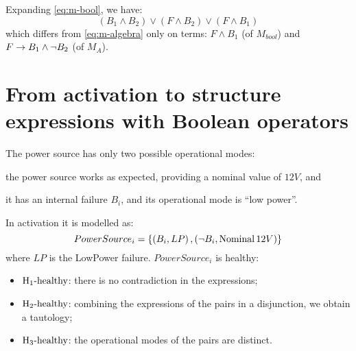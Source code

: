 Expanding \cref{eq:m-bool}, we have:
\[
(B_1\land B_2) \lor (F \land B_2) \lor (F \land B_1)
\]
%
which differs from \cref{eq:m-algebra} only on terms: $F \land B_1$ (of $M_{bool}$) and $F \rightarrow B_1\land \lnot B_2$ (of $M_A$).

\section{From \ac*{activation} to structure expressions with Boolean operators}
\label{sec:activation-to-structure-expressions-boolean-operators}

The power source has only two possible operational modes: 
\begin{alineasinline}
  \item the power source works as expected, providing a nominal value of $12V$, and 
  \item it has an internal failure $B_i$, and its operational mode is ``low power''.
\end{alineasinline}
%
In \ac{activation} it is modelled as:
\begin{equation}
\label{eq:power-source}
PowerSource_i = \left\{
  \left(B_i, LP\right),
  \left(\lnot B_i, \mathop{\mathrm{Nominal}} 12V\right)
  \right\}
\end{equation}
%
where $LP$ is the LowPower failure.
$PowerSource_i$ is healthy:
\begin{itemize}
	\item $\healthy[1]$: there is no contradiction in the expressions;
	\item$\healthy[2]$: combining the expressions of the pairs in a disjunction, we obtain a tautology;
	\item$\healthy[3]$: the operational modes of the pairs are distinct.
\end{itemize}


